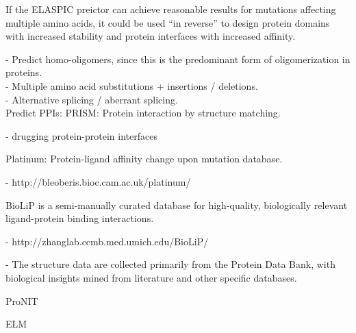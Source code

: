 If the ELASPIC preictor can achieve reasonable results for mutations affecting multiple amino acids, it could be used ``in reverse'' to design protein domains with increased stability and protein interfaces with increased affinity.



- Predict homo-oligomers, since this is the predominant form of oligomerization in proteins. \\
- Multiple amino acid substitutions + insertions / deletions. \\
- Alternative splicing / aberrant splicing. \\



Predict PPIs: PRISM: Protein interaction by structure matching.




- drugging protein-protein interfaces \cite{wells_reaching_2007}

Platinum: Protein-ligand affinity change upon mutation database.

  - http://bleoberis.bioc.cam.ac.uk/platinum/


BioLiP is a semi-manually curated database for high-quality, biologically relevant ligand-protein binding interactions.

  - http://zhanglab.ccmb.med.umich.edu/BioLiP/

  - The structure data are collected primarily from the Protein Data Bank, with biological insights mined from literature and other specific databases.




ProNIT




ELM
